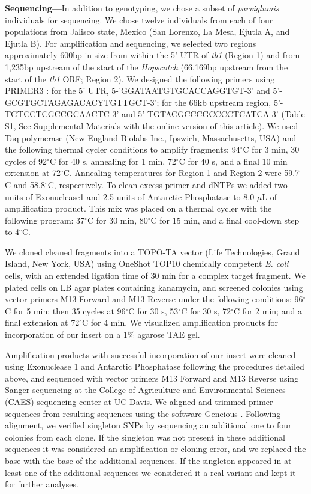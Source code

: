 \documentclass[11pt]{article} %
\begin{document}
\begin{linenumbers}
\begin{flushleft}
\textbf{Sequencing---}In addition to genotyping, we chose a subset of \emph{parviglumis} individuals for sequencing. We chose twelve individuals from each of four populations from Jalisco state, Mexico (San Lorenzo, La Mesa, Ejutla A, and Ejutla B). For amplification and sequencing, we selected two regions approximately 600bp in size from within the 5' UTR of \emph{tb1} (Region 1) and from 1,235bp upstream of the start of the \emph{Hopscotch} (66,169bp upstream from the start of the \emph{tb1} ORF; Region 2). We designed the following primers using PRIMER3 \citep{RozenSkaletsky2000}: for the 5' UTR, {\small 5-'GGATAATGTGCACCAGGTGT-3'} and {\small 5'-GCGTGCTAGAGACACYTGTTGCT-3'}; for the 66kb upstream region, {\small 5'-TGTCCTCGCCGCAACTC-3'} and {\small 5'-TGTACGCCCGCCCCTCATCA-3'} (Table S1, See Supplemental Materials with the online version of this article). We used Taq polymerase (New England Biolabs Inc., Ipswich, Massachusetts, USA) and the following thermal cycler conditions to amplify fragments: 94$^{\circ}$C for 3 min, 30 cycles of 92$^{\circ}$C for 40 s, annealing for 1 min, 72$^{\circ}$C for 40 s, and a final 10 min extension at 72$^{\circ}$C. Annealing temperatures for Region 1 and Region 2 were 59.7$^{\circ}$C and 58.8$^{\circ}$C, respectively. To clean excess primer and dNTPs we added two units of Exonuclease1 and 2.5 units of Antarctic Phosphatase to 8.0 $\mu$L of amplification product. This mix was placed on a thermal cycler with the following program: 37$^{\circ}$C for 30 min, 80$^{\circ}$C for 15 min, and a final cool-down step to 4$^{\circ}$C. 

We cloned cleaned fragments into a TOPO-TA vector (Life Technologies, Grand Island, New York, USA) using OneShot TOP10 chemically competent \emph{E. coli} cells, with an extended ligation time of 30 min for a complex target fragment. We plated cells on LB agar plates containing kanamycin, and screened colonies using vector primers M13 Forward and M13 Reverse under the following conditions: 96$^{\circ}$C for 5 min; then 35 cycles at 96$^{\circ}$C for 30 s, 53$^{\circ}$C for 30 s, 72$^{\circ}$C for 2 min; and a final extension at 72$^{\circ}$C for 4 min. We visualized amplification products for incorporation of our insert on a 1\% agarose TAE gel.

Amplification products with successful incorporation of our insert were cleaned using Exonuclease 1 and Antarctic Phosphatase following the procedures detailed above, and sequenced with vector primers M13 Forward and M13 Reverse using Sanger sequencing at the College of Agriculture and Environmental Sciences (CAES) sequencing center at UC Davis. We aligned and trimmed primer sequences from resulting sequences using the software Geneious \citep{Kearse2012}. Following alignment, we verified singleton SNPs by sequencing an additional one to four colonies from each clone. If the singleton was not present in these additional sequences it was considered an amplification or cloning error, and we replaced the base with the base of the additional sequences. If the singleton appeared in at least one of the additional sequences we considered it a real variant and kept it for further analyses. 


\end{flushleft}
\end{linenumbers}
\end{document}
